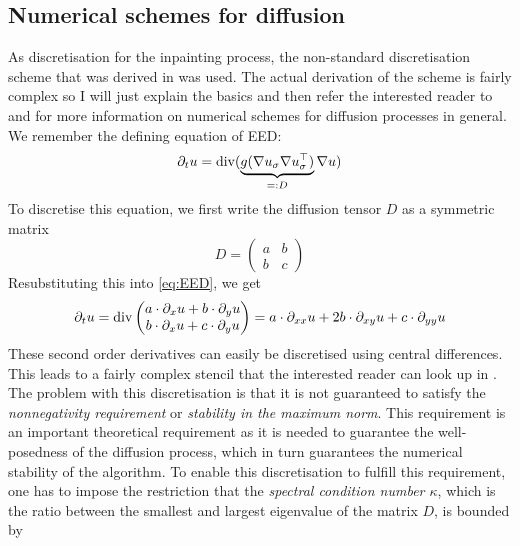 \subsection{Numerical schemes for diffusion}\label{sub:NumSchemesDiffusion}
As discretisation for the inpainting process, the non-standard discretisation scheme that was
derived in \cite{www13} was used. The actual derivation of the scheme is fairly complex so I will
just explain the basics and then refer the interested reader to \cite{www13} and \cite{weickert96}
for more information on numerical schemes for diffusion processes in general.\\
We remember the defining equation of EED:
\begin{equation}
    \partial_t u = \operatorname{div}(\underbrace{g(\mathbf{\nabla} u_\sigma\mathbf{\nabla} u_\sigma^\top)}_{=:D}\mathbf{\nabla}
    u)\label{eq:EED}
\end{equation}
To discretise this equation, we first write the diffusion tensor $D$ as a symmetric matrix
\begin{equation}
    D = \begin{pmatrix}
        a&b\\b&c
    \end{pmatrix}
\end{equation}
Resubstituting this into \eqref{eq:EED}, we get 
\begin{equation}
\partial_t u = \operatorname{div} \begin{pmatrix}
    a\cdot \partial_x u+b\cdot \partial_y u\\
    b\cdot \partial_x u+c\cdot \partial_y u
\end{pmatrix} = a\cdot\partial_{xx} u + 2b\cdot \partial_{xy}u+ c\cdot \partial_{yy} u
\end{equation}
These second order derivatives can easily be discretised using central differences. This leads to a
fairly complex stencil that the interested reader can look up in \cite{weickert96}.
The problem with this discretisation is that it is not guaranteed to satisfy the
\textit{nonnegativity requirement} or \textit{stability in the maximum norm}\cite{weickert96}. This requirement is
an important theoretical requirement as it is needed to guarantee the well-posedness of the
diffusion process, which in turn guarantees the numerical stability of the algorithm. \cite{weickert96}
To enable this discretisation to fulfill this requirement, one has to impose the restriction that
the \textit{spectral condition number $\kappa$}, which is the ratio between the smallest and
largest eigenvalue of the matrix $D$, is bounded by 
